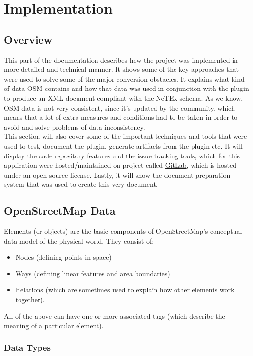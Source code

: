 \chapter{Implementation}
\section{Overview}
This part of the documentation describes how the project was implemented in more-detailed and technical manner. It shows some of the key approaches that were used to solve some of the major conversion obstacles. It explains what kind of data OSM contains and how that data was used in conjunction with the plugin to produce an XML document compliant with the NeTEx schema. As we know, OSM data is not very consistent, since it's updated by the community, which means that a lot of extra measures and conditions had to be taken in order to avoid and solve problems of data inconsistency.\\
\newline
This section will also cover some of the important techniques and tools that were used to test, document the plugin, generate artifacts from the plugin etc. It will display the code repository features and the issue tracking tools, which for this application were hosted/maintained on project called \href{https://gitlab.com/}{GitLab}, which is hosted under an open-source license. Lastly, it will show the document preparation system that was used to create this very document.
\newpage
\section{OpenStreetMap Data}
Elements (or objects) are the basic components of OpenStreetMap's conceptual data model of the physical world. They consist of:
\begin{itemize}
	\item Nodes (defining points in space)
	\item Ways (defining linear features and area boundaries)
	\item Relations (which are sometimes used to explain how other elements work together).
\end{itemize}
All of the above can have one or more associated tags (which describe the meaning of a particular element). \cite{OSMElements}
\subsection{Data Types}
\label{sec:OSMDataTypes}
